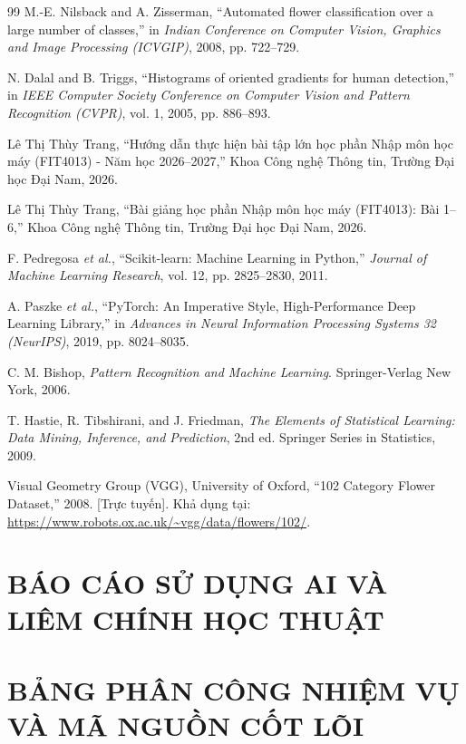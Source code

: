 \documentclass[a4paper,12pt,twoside]{extreport}
\begin{document}
\newpage
{}
\begin{thebibliography}{99}
M.-E. Nilsback and A. Zisserman, ``Automated flower classification over a large number of classes,'' in \textit{Indian Conference on Computer Vision, Graphics and Image Processing (ICVGIP)}, 2008, pp. 722--729.

N. Dalal and B. Triggs, ``Histograms of oriented gradients for human detection,'' in \textit{IEEE Computer Society Conference on Computer Vision and Pattern Recognition (CVPR)}, vol. 1, 2005, pp. 886--893.

Lê Thị Thùy Trang, ``Hướng dẫn thực hiện bài tập lớn học phần Nhập môn học máy (FIT4013) - Năm học 2026--2027,'' Khoa Công nghệ Thông tin, Trường Đại học Đại Nam, 2026.

Lê Thị Thùy Trang, ``Bài giảng học phần Nhập môn học máy (FIT4013): Bài 1--6,'' Khoa Công nghệ Thông tin, Trường Đại học Đại Nam, 2026.

F. Pedregosa \textit{et al.}, ``Scikit-learn: Machine Learning in Python,'' \textit{Journal of Machine Learning Research}, vol. 12, pp. 2825--2830, 2011.

A. Paszke \textit{et al.}, ``PyTorch: An Imperative Style, High-Performance Deep Learning Library,'' in \textit{Advances in Neural Information Processing Systems 32 (NeurIPS)}, 2019, pp. 8024--8035.

C. M. Bishop, \textit{Pattern Recognition and Machine Learning}. Springer-Verlag New York, 2006.

T. Hastie, R. Tibshirani, and J. Friedman, \textit{The Elements of Statistical Learning: Data Mining, Inference, and Prediction}, 2nd ed. Springer Series in Statistics, 2009.

Visual Geometry Group (VGG), University of Oxford, ``102 Category Flower Dataset,'' 2008. [Trực tuyến]. Khả dụng tại: \url{https://www.robots.ox.ac.uk/~vgg/data/flowers/102/}.
\end{thebibliography}

\appendix
\chapter{BÁO CÁO SỬ DỤNG AI VÀ LIÊM CHÍNH HỌC THUẬT}


\chapter{BẢNG PHÂN CÔNG NHIỆM VỤ VÀ MÃ NGUỒN CỐT LÕI}

\end{document}

